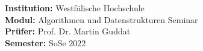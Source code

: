 \begin{titlepage}
    \maketitle
    \vspace{2cm}
    
    \vspace*{\fill}
    \begin{flushleft}
        \Large{\textbf{Institution:} Westfälische Hochschule}\\
        \Large{\textbf{Modul:} Algorithmen und Datenstrukturen Seminar} \\
        \Large{\textbf{Prüfer:} Prof. Dr. Martin Guddat}\\
        \Large{\textbf{Semester:} SoSe 2022}
    \end{flushleft}
\end{titlepage}
